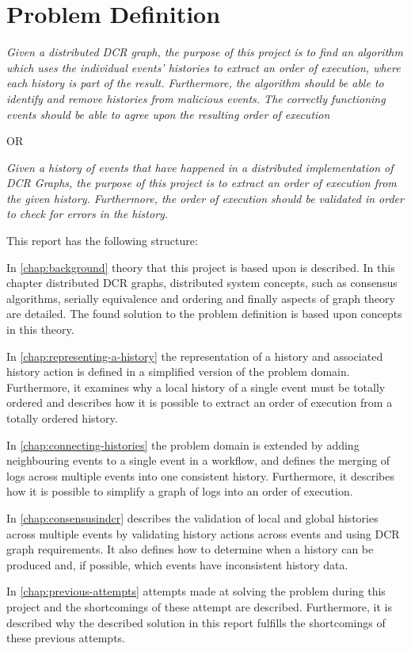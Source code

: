 \section{Problem Definition} %
	\textit{Given a distributed DCR graph, the purpose of this project is to find an algorithm which uses the individual events' histories to extract an order of execution, where each history is part of the result. Furthermore, the algorithm should be able to identify and remove histories from malicious events. The correctly functioning events should be able to agree upon the resulting order of execution}
	
	OR
	
	\textit{Given a history of events that have happened in a distributed implementation of DCR Graphs, the purpose of this project is to extract an order of execution from the given history. Furthermore, the order of execution should be validated in order to check for errors  in the history.}
	
	\vspace{0.6cm}
	
	\newpar
	This report has the following structure:
	
	\newpar
	In \autoref{chap:background} theory that this project is based upon is described. In this chapter distributed DCR graphs, distributed system concepts, such as consensus algorithms, serially equivalence and ordering and finally aspects of graph theory are detailed.
	The found solution to the problem definition is based upon concepts in this theory.
		
	\newpar
	In \autoref{chap:representing-a-history} the representation of a history and associated history action is defined in a simplified version of the problem domain. 
	Furthermore, it examines why a local history of a single event must be totally ordered and describes how it is possible to extract an order of execution from a totally ordered history.
		
	\newpar
	In \autoref{chap:connecting-histories} the problem domain is extended by adding neighbouring events to a single event in a workflow, and defines the merging of logs across multiple events into one consistent history. Furthermore, it describes how it is possible to simplify a graph of logs into an order of execution.
	
	\newpar
	In \autoref{chap:consensusindcr} describes the validation of local and global histories across multiple events by validating history actions across events and using DCR graph requirements. It also defines how to determine when a history can be produced and, if possible, which events have inconsistent history data.
	
	\newpar
	In \autoref{chap:previous-attempts} attempts made at solving the problem during this project and the shortcomings of these attempt are described. Furthermore, it is described why the described solution in this report fulfills the shortcomings of these previous attempts. 
		
	